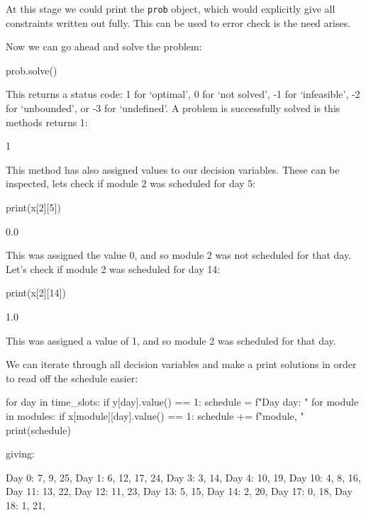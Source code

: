 At this stage we could print the \texttt{prob} object, which would
explicitly give all constraints written out fully. This can be used to error
check is the need arises.

Now we can go ahead and solve the problem:

\begin{pyin}
prob.solve()
\end{pyin}

This returns a status code: 1 for `optimal', 0 for `not solved', -1 for
`infeasible', -2 for `unbounded', or -3 for `undefined'. A problem is
successfully solved is this methods returns 1:

\begin{pyout}
1
\end{pyout}

This method has also assigned values to our decision variables. These can be
inspected, lets check if module 2 was scheduled for day 5:

\begin{pyin}
print(x[2][5])
\end{pyin}

\begin{pyout}
0.0
\end{pyout}

This was assigned the value 0, and so module 2 was not scheduled for that day.
Let's check if module 2 was scheduled for day 14:

\begin{pyin}
print(x[2][14])
\end{pyin}

\begin{pyout}
1.0
\end{pyout}

This was assigned a value of 1, and so module 2 was scheduled for that day.

We can iterate through all decision variables and make a print solutions in
order to read off the schedule easier:

\begin{pyin}
for day in time_slots:
    if y[day].value() == 1:
        schedule = f"Day {day}: "
        for module in modules:
            if x[module][day].value() == 1:
                 schedule += f"{module}, "
        print(schedule)
\end{pyin}

giving:

\begin{pyout}
Day 0: 7, 9, 25,
Day 1: 6, 12, 17, 24,
Day 3: 3, 14,
Day 4: 10, 19,
Day 10: 4, 8, 16,
Day 11: 13, 22,
Day 12: 11, 23,
Day 13: 5, 15,
Day 14: 2, 20,
Day 17: 0, 18,
Day 18: 1, 21,
\end{pyout}

